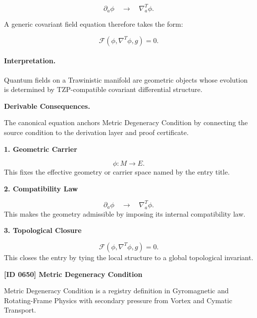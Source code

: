 \begin{equation}
\partial_a\phi
\quad\longrightarrow\quad
\nabla^T_a\phi .
\end{equation}

A generic covariant field equation therefore takes the form:

\begin{equation}
\mathcal{F}
\left(
\phi,\nabla^T\phi,g
\right)
=
0 .
\end{equation}

\paragraph{Interpretation.}
Quantum fields on a Trawinistic manifold are geometric objects whose evolution is determined by TZP-compatible covariant differential structure.

\par\vspace{0.35em}
\noindent\textbf{Derivable Consequences.}\quad
\begingroup
\footnotesize
\raggedright
The canonical equation anchors Metric Degeneracy Condition by connecting the source condition to the derivation layer and proof certificate.
\par\endgroup

\noindent\textbf{1. Geometric Carrier}\par
\[
\phi:M\to E.
\]
\noindent This fixes the effective geometry or carrier space named by the entry title.\par
\noindent\textbf{2. Compatibility Law}\par
\[
\partial_a\phi \quad\longrightarrow\quad \nabla^T_a\phi.
\]
\noindent This makes the geometry admissible by imposing its internal compatibility law.\par
\noindent\textbf{3. Topological Closure}\par
\[
\mathcal{F} \left( \phi,\nabla^T\phi,g \right) = 0.
\]
\noindent This closes the entry by tying the local structure to a global topological invariant.\par

\clearpage
\noindent\textbf{[ID 0650] Metric Degeneracy Condition}\par
\vspace{0.35em}
\begingroup\small
{}
Metric Degeneracy Condition is a registry definition in Gyromagnetic and Rotating-Frame Physics with secondary pressure from Vortex and Cymatic Transport.

